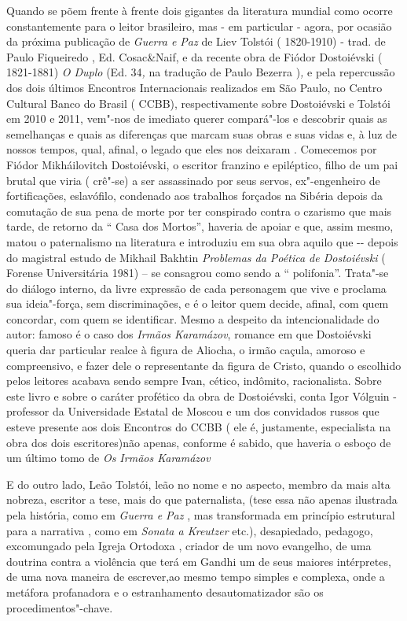 Quando se põem frente à frente dois gigantes da literatura mundial como
ocorre constantemente para o leitor brasileiro, mas - em particular -
agora, por ocasião da próxima publicação de \emph{Guerra e Paz} de Liev
Tolstói ( 1820-1910) - trad. de Paulo Fiqueiredo , Ed. Cosac\&Naif, e da
recente obra de Fiódor Dostoiévski ( 1821-1881) \emph{O Duplo} (Ed.
34\emph{,} na tradução de Paulo Bezerra )\emph{,} e pela repercussão dos
dois últimos Encontros Internacionais realizados em São Paulo, no Centro
Cultural Banco do Brasil ( CCBB), respectivamente sobre Dostoiévski e
Tolstói em 2010 e 2011, vem"-nos de imediato querer compará"-los e
descobrir quais as semelhanças e quais as diferenças que marcam suas
obras e suas vidas e, à luz de nossos tempos, qual, afinal, o legado que
eles nos deixaram . Comecemos por Fiódor Mikháilovitch Dostoiévski, o
escritor franzino e epiléptico, filho de um pai brutal que viria (
crê"-se) a ser assassinado por seus servos, ex"-engenheiro de
fortificações, eslavófilo, condenado aos trabalhos forçados na Sibéria
depois da comutação de sua pena de morte por ter conspirado contra o
czarismo que mais tarde, de retorno da `` Casa dos Mortos'', haveria de
apoiar e que, assim mesmo, matou o paternalismo na literatura e
introduziu em sua obra aquilo que -\/- depois do magistral estudo de
Mikhail Bakhtin \emph{Problemas da Poética de Dostoiévski} ( Forense
Universitária 1981) -- se consagrou como sendo a `` polifonia''.
Trata"-se do diálogo interno, da livre expressão de cada personagem que
vive e proclama sua ideia"-força, sem discriminações, e é o leitor quem
decide, afinal, com quem concordar, com quem se identificar. Mesmo a
despeito da intencionalidade do autor: famoso é o caso dos \emph{Irmãos
Karamázov}, romance em que Dostoiévski queria dar particular realce à
figura de Aliocha, o irmão caçula, amoroso e compreensivo, e fazer dele
o representante da figura de Cristo, quando o escolhido pelos leitores
acabava sendo sempre Ivan, cético, indômito, racionalista. Sobre este
livro e sobre o caráter profético da obra de Dostoiévski, conta Igor
Vólguin - professor da Universidade Estatal de Moscou e um dos
convidados russos que esteve presente aos dois Encontros do CCBB ( ele é, justamente, especialista na obra dos dois escritores)não apenas,
conforme é sabido, que haveria o esboço de um último tomo de \emph{Os
Irmãos Karamázov}

E do outro lado, Leão Tolstói, leão no nome e no aspecto, membro da mais
alta nobreza, escritor a tese, mais do que paternalista, (tese essa não
apenas ilustrada pela história, como em \emph{Guerra e Paz} , mas
transformada em princípio estrutural para a narrativa , como em
\emph{Sonata a Kreutzer} etc.), desapiedado, pedagogo, excomungado pela
Igreja Ortodoxa , criador de um novo evangelho, de uma doutrina contra a
violência que terá em Gandhi um de seus maiores intérpretes, de uma nova
maneira de escrever,ao mesmo tempo simples e complexa, onde a metáfora
profanadora e o estranhamento desautomatizador são os
procedimentos"-chave.

